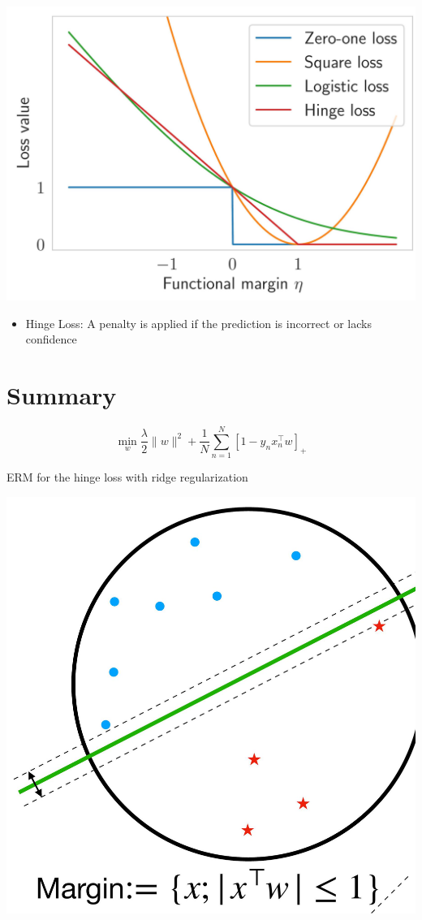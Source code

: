 \documentclass[10pt]{article}
\begin{document}
\begin{center}
\includegraphics[max width=\textwidth]{2023_12_30_bf5d191916c1e78fa6d6g-12}
\end{center}

\begin{itemize}
  \item Hinge Loss: A penalty is applied if the prediction is incorrect or lacks confidence
\end{itemize}

\section*{Summary}
$$
\min _{w} \frac{\lambda}{2}\|w\|^{2}+\frac{1}{N} \sum_{n=1}^{N}\left[1-y_{n} x_{n}^{\top} w\right]_{+}
$$

ERM for the hinge loss with ridge regularization

\begin{center}
\includegraphics[max width=\textwidth]{2023_12_30_bf5d191916c1e78fa6d6g-13(1)}
\end{center}
\end{document}
